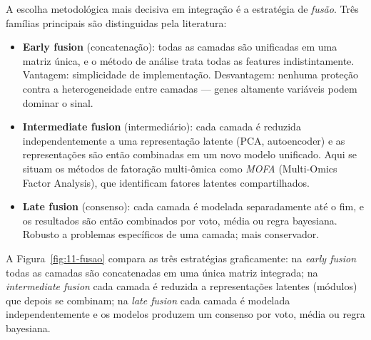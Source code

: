A escolha metodológica mais decisiva em integração é a estratégia de \emph{fusão}.
Três famílias principais são distinguidas pela literatura:

\begin{itemize}
\item \textbf{Early fusion} (concatenação): todas as camadas são unificadas em
  uma matriz única, e o método de análise trata todas as features
  indistintamente. Vantagem: simplicidade de implementação. Desvantagem:
  nenhuma proteção contra a heterogeneidade entre camadas --- genes
  altamente variáveis podem dominar o sinal.
\item \textbf{Intermediate fusion} (intermediário): cada camada é reduzida
  independentemente a uma representação latente (PCA, autoencoder) e as
  representações são então combinadas em um novo modelo unificado. Aqui se
  situam os métodos de fatoração multi-ômica como \emph{MOFA}
  (Multi-Omics Factor Analysis), que identificam fatores latentes compartilhados.
\item \textbf{Late fusion} (consenso): cada camada é modelada separadamente até
  o fim, e os resultados são então combinados por voto, média ou regra
  bayesiana. Robusto a problemas específicos de uma camada; mais conservador.
\end{itemize}

A Figura~\ref{fig:11-fusao} compara as três estratégias graficamente:
na \emph{early fusion} todas as camadas são concatenadas em uma única
matriz integrada; na \emph{intermediate fusion} cada camada é reduzida
a representações latentes (módulos) que depois se combinam; na \emph{late
fusion} cada camada é modelada independentemente e os modelos produzem
um consenso por voto, média ou regra bayesiana.

